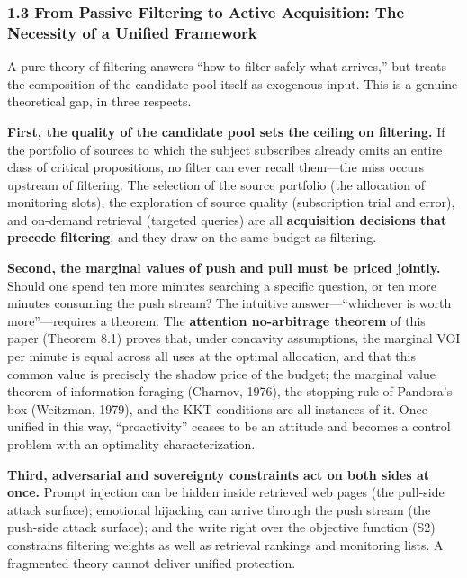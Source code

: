 \documentclass[
  11pt]{article}
\begin{document}
\subsubsection{1.3 From Passive Filtering to Active Acquisition: The
Necessity of a Unified
Framework}\label{from-passive-filtering-to-active-acquisition-the-necessity-of-a-unified-framework}

A pure theory of filtering answers ``how to filter safely what
arrives,'' but treats the composition of the candidate pool itself as
exogenous input. This is a genuine theoretical gap, in three respects.

\textbf{First, the quality of the candidate pool sets the ceiling on
filtering.} If the portfolio of sources to which the subject subscribes
already omits an entire class of critical propositions, no filter can
ever recall them---the miss occurs upstream of filtering. The selection
of the source portfolio (the allocation of monitoring slots), the
exploration of source quality (subscription trial and error), and
on-demand retrieval (targeted queries) are all \textbf{acquisition
decisions that precede filtering}, and they draw on the same budget as
filtering.

\textbf{Second, the marginal values of push and pull must be priced
jointly.} Should one spend ten more minutes searching a specific
question, or ten more minutes consuming the push stream? The intuitive
answer---``whichever is worth more''---requires a theorem. The
\textbf{attention no-arbitrage theorem} of this paper (Theorem 8.1)
proves that, under concavity assumptions, the marginal VOI per minute is
equal across all uses at the optimal allocation, and that this common
value is precisely the shadow price of the budget; the marginal value
theorem of information foraging (Charnov, 1976), the stopping rule of
Pandora's box (Weitzman, 1979), and the KKT conditions are all instances
of it. Once unified in this way, ``proactivity'' ceases to be an
attitude and becomes a control problem with an optimality
characterization.

\textbf{Third, adversarial and sovereignty constraints act on both sides
at once.} Prompt injection can be hidden inside retrieved web pages (the
pull-side attack surface); emotional hijacking can arrive through the
push stream (the push-side attack surface); and the write right over the
objective function (S2) constrains filtering weights as well as
retrieval rankings and monitoring lists. A fragmented theory cannot
deliver unified protection.
\end{document}
